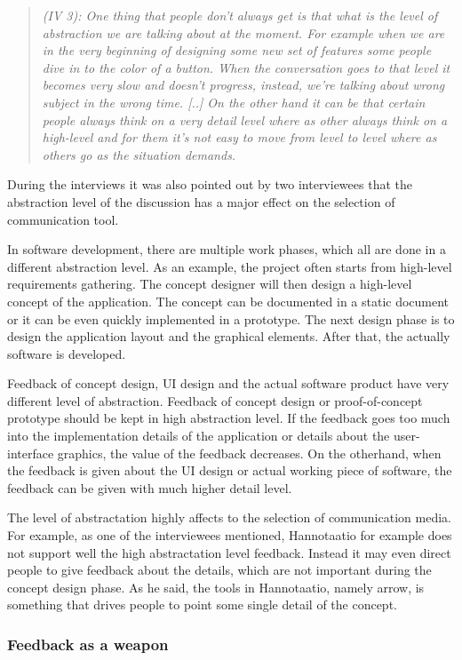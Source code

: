\documentclass[english,12pt,a4paper,pdftex]{article}
\newcommand{\q}[2]{
\begin{quote}
\emph{(IV #1): #2}
\end{quote}}
\begin{document}
\q{3}{One thing that people don't always get is that what is the level of abstraction we are talking about at the moment. For example when we are in the very beginning of designing some new set of features some people dive in to the color of a button. When the conversation goes to that level it becomes very slow and doesn't progress, instead, we're talking about wrong subject in the wrong time. [..] On the other hand it can be that certain people always think on a very detail level where as other always think on a high-level and for them it's not easy to move from level to level where as others go as the situation demands.}

During the interviews it was also pointed out by two interviewees that the abstraction level of the discussion has a major effect on the selection of communication tool.

In software development, there are multiple work phases, which all are done in a different abstraction level. As an example, the project often starts from high-level requirements gathering. The concept designer will then design a high-level concept of the application. The concept can be documented in a static document or it can be even quickly implemented in a prototype. The next design phase is to design the application layout and the graphical elements. After that, the actually software is developed.

Feedback of concept design, \ac{UI} design and the actual software product have very different level of abstraction. Feedback of concept design or proof-of-concept prototype should be kept in high abstraction level. If the feedback goes too much into the implementation details of the application or details about the user-interface graphics, the value of the feedback decreases. On the otherhand, when the feedback is given about the \ac{UI} design or actual working piece of software, the feedback can be given with much higher detail level.

The level of abstractation highly affects to the selection of communication media. For example, as one of the interviewees mentioned, Hannotaatio for example does not support well the high abstractation level feedback. Instead it may even direct people to give feedback about the details, which are not important during the concept design phase. As he said, the tools in Hannotaatio, namely arrow, is something that drives people to point some single detail of the concept.

\subsubsection{Feedback as a weapon}
\end{document}
